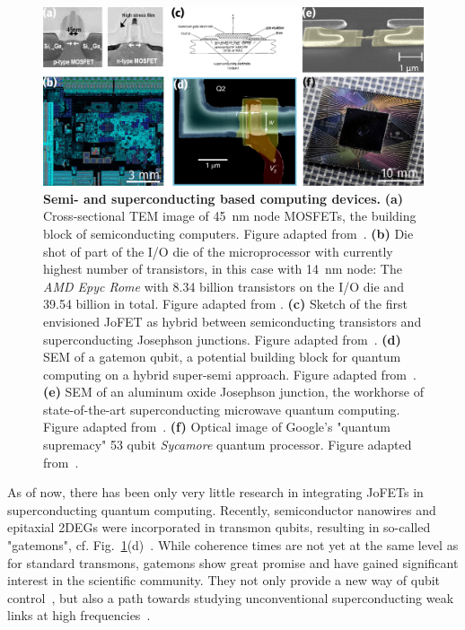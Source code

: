 \begin{figure}[t]
	\centering
	\includegraphics[width=\linewidth]{chapter-introduction/figs/intro_computing.svg.png}
	\caption{
		\textbf{Semi- and superconducting based computing devices.}
		\textbf{(a)} Cross-sectional TEM image of \SI{45}{\nano\meter} node MOSFETs, the building block of semiconducting computers.
		Figure adapted from~\cite{thompsonLogicNanotechnologyFeaturing2004}.
		\textbf{(b)} Die shot of part of the I/O die of the microprocessor with currently highest number of transistors, in this case with \SI{14}{\nano\meter} node: The \textit{AMD Epyc Rome} with \num{8.34} billion transistors on the I/O die and \num{39.54} billion in total.
		Figure adapted from \cite{fritzAMD7nm12nmIOD2019}.
		\textbf{(c)} Sketch of the first envisioned JoFET as hybrid between semiconducting transistors and superconducting Josephson junctions.
		Figure adapted from~\cite{clarkFeasibilityHybridJosephson1980}.
		\textbf{(d)} SEM of a gatemon qubit, a potential building block for quantum computing on a hybrid super-semi approach.
		Figure adapted from~\cite{casparisSuperconductingGatemonQubit2018}.
		\textbf{(e)} SEM of an aluminum oxide Josephson junction, the workhorse of state-of-the-art superconducting microwave quantum  computing.
		Figure adapted from~\cite{langfordExperimentallySimulatingDynamics2017}.
		\textbf{(f)} Optical image of Google's "quantum supremacy" 53 qubit \textit{Sycamore} quantum processor.
		Figure adapted from~\cite{shanklandTakeLookGoogle2020}. 
	}
	\label{fig:introcomputing}
\end{figure}

As of now, there has been only very little research in integrating JoFETs in superconducting quantum computing.
%
Recently, semiconductor nanowires and epitaxial 2DEGs were incorporated in transmon qubits, resulting in so-called "gatemons", cf. Fig.~\ref{fig:introcomputing}(d)~\cite{delangeRealizationMicrowaveQuantum2015,larsenSemiconductorNanowireBasedSuperconductingQubit2015,casparisGatemonBenchmarkingTwoQubit2016a,casparisSuperconductingGatemonQubit2018,luthiEvolutionNanowireTransmon2018}.
%
While coherence times are not yet at the same level as for standard transmons, gatemons show great promise and have gained significant interest in the scientific community.
%
They not only provide a new way of qubit control~\cite{shimSemiconductorinspiredDesignPrinciples2016}, but also a path towards studying unconventional superconducting weak links at high frequencies~\cite{tahanGrapheneQubitMotivates2019}.





